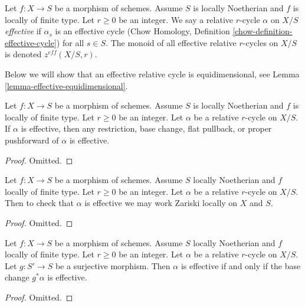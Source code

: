 \begin{definition}
\label{definition-effective}
Let $f : X \to S$ be a morphism of schemes. Assume $S$ is locally Noetherian
and $f$ is locally of finite type. Let $r \geq 0$ be an integer. We say a
relative $r$-cycle $\alpha$ on $X/S$ {\it effective} if $\alpha_s$ is an
effective cycle
(Chow Homology, Definition \ref{chow-definition-effective-cycle})
for all $s \in S$. The monoid of all effective relative $r$-cycles
on $X/S$ is denoted $z^{eff}(X/S, r)$.
\end{definition}

\noindent
Below we will show that an effective relative cycle is equidimensional,
see Lemma \ref{lemma-effective-equidimensional}.

\begin{lemma}
\label{lemma-effective-functoriality}
Let $f : X \to S$ be a morphism of schemes. Assume $S$ is locally Noetherian
and $f$ is locally of finite type. Let $r \geq 0$ be an integer. Let
$\alpha$ be a relative $r$-cycle on $X/S$. If $\alpha$ is effective,
then any restriction, base change, flat pullback, or proper pushforward
of $\alpha$ is effective.
\end{lemma}

\begin{proof}
Omitted.
\end{proof}

\begin{lemma}
\label{lemma-check-effective}
Let $f : X \to S$ be a morphism of schemes. Assume $S$ locally Noetherian
and $f$ locally of finite type. Let $r \geq 0$ be an integer. Let $\alpha$
be a relative $r$-cycle on $X/S$. Then to check that $\alpha$ is effective
we may work Zariski locally on $X$ and $S$.
\end{lemma}

\begin{proof}
Omitted.
\end{proof}

\begin{lemma}
\label{lemma-effective-descent}
Let $f : X \to S$ be a morphism of schemes. Assume $S$ locally Noetherian
and $f$ locally of finite type. Let $r \geq 0$ be an integer. Let $\alpha$
be a relative $r$-cycle on $X/S$. Let $g : S' \to S$ be a surjective morphism.
Then $\alpha$ is effective if and only if the base change $g^*\alpha$
is effective.
\end{lemma}

\begin{proof}
Omitted.
\end{proof}

